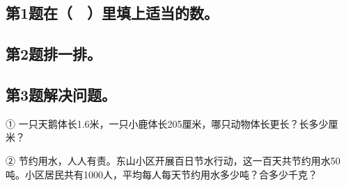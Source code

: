 \subsection*{第1题\quad 在（　）里填上适当的数。}
\subsection*{第2题\quad 排一排。}
\subsection*{第3题\quad 解决问题。}
\noindent ① 一只天鹅体长1.6米，一只小鹿体长205厘米，哪只动物体长更长？长多少厘米？\par
{}
\noindent ② 节约用水，人人有责。东山小区开展百日节水行动，这一百天共节约用水50吨。小区居民共有1000人，平均每人每天节约用水多少吨？合多少千克？\par
{}
